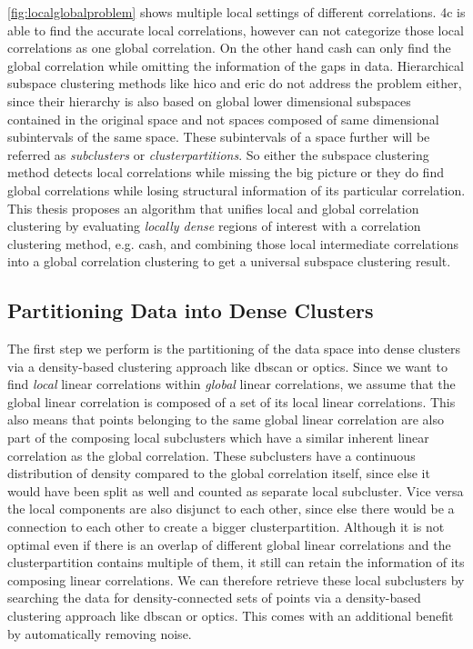 \autoref{fig:localglobalproblem}  shows multiple local settings of different correlations. \gls{4c} is able to find the accurate local correlations, however can not categorize those local correlations as one global correlation. 
On the other hand \gls{cash} can only find the global correlation while omitting the information of the gaps in data. Hierarchical subspace clustering methods like \acrshort{hico} and \acrshort{eric} do not address the problem either, since their hierarchy is also based on global lower dimensional subspaces contained in the original space and not spaces composed of same dimensional subintervals of the same space. These subintervals of a space further will be referred as \textit{subclusters} or \textit{clusterpartitions}.
So either the subspace clustering method detects local correlations while missing the big picture or they do find global correlations while losing structural information of its particular correlation. This thesis proposes an algorithm that unifies local and global correlation clustering by evaluating \textit{locally dense} regions of interest with a correlation clustering method, e.g. \gls{cash}, and combining those local intermediate correlations into a global correlation clustering to get a universal subspace clustering result. 


\subsection{Partitioning Data into Dense Clusters}
The first step we perform is the partitioning of the data space into dense clusters via a density-based clustering approach like \gls{dbscan} or \gls{optics}. 
Since we want to find \textit{local} linear correlations within \textit{global} linear correlations, we assume that the global linear correlation is composed of a set of its local linear correlations. This also means that points belonging to the same global linear correlation are also part of the composing local subclusters which have a similar inherent linear correlation as the global correlation. These subclusters have a continuous distribution of density compared to the global correlation itself, since else it would have been split as well and counted as separate local subcluster. Vice versa the local components are also disjunct to each other, since else there would be a connection to each other to create a bigger clusterpartition. Although it is not optimal even if there is an overlap of different global linear correlations and the clusterpartition contains multiple of them, it still can retain the information of its composing linear correlations.
We can therefore retrieve these local subclusters by searching the data for density-connected sets of points via a density-based clustering approach like \gls{dbscan} or \gls{optics}. This comes with an additional benefit by automatically removing noise. 

